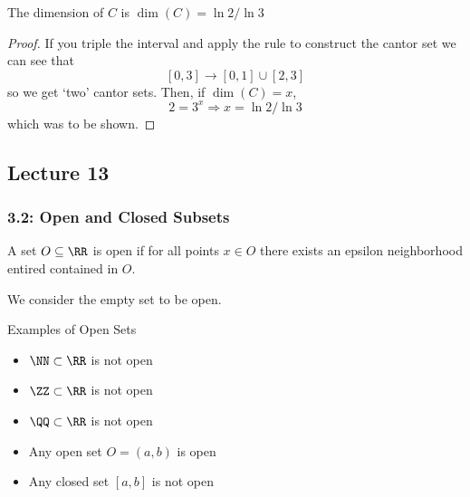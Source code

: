 \begin{lma}{}
    The dimension of $C$ is $\dim(C) = \ln 2 / \ln 3$
    \begin{proof}
        If you triple the interval and apply the rule to construct the cantor set we can see that 
        \[
            [0, 3] \to [0, 1] \cup [2, 3] 
        \]
        so we get `two' cantor sets. Then, if $\dim(C) = x$, 
        \[
            2 = 3^x \Rightarrow x = \ln2 / \ln 3
        \]
        which was to be shown.
    \end{proof}
\end{lma}

\subsection{Lecture 13}
\subsubsection{3.2: Open and Closed Subsets}
\begin{defbox}{}{}
    A set $O \subseteq \RR$ is open if for all points $x \in O$ there exists an epsilon neighborhood entired contained in $O$. 
\end{defbox}

We consider the empty set to be open.

\begin{example}{Examples of Open Sets}{}
    \begin{itemize}
        \item $\NN \subset \RR$ is not open
        \item $\ZZ \subset \RR$ is not open
        \item $\QQ \subset \RR$ is not open
        \item Any open set $O = (a, b)$ is open 
        \item Any closed set $[a, b]$ is not open
    \end{itemize}
\end{example}


